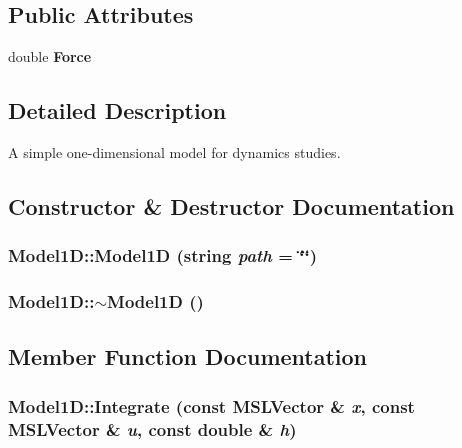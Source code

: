 \subsection*{Public Attributes}
\begin{CompactItemize}
\item 
double {\bf Force}
\end{CompactItemize}


\subsection{Detailed Description}
A simple one-dimensional model for dynamics studies.



\subsection{Constructor \& Destructor Documentation}
\subsubsection{\setlength{\rightskip}{0pt plus 5cm}Model1D::Model1D (string {\em path} = \char`\"{}\char`\"{})}\label{classModel1D_a0}


\subsubsection{\setlength{\rightskip}{0pt plus 5cm}Model1D::$\sim$Model1D ()\hspace{0.3cm}{\tt  [inline, virtual]}}\label{classModel1D_a1}




\subsection{Member Function Documentation}
\subsubsection{ Model1D::Integrate (const {\bf MSLVector} \& {\em x}, const {\bf MSLVector} \& {\em u}, const double \& {\em h})\hspace{0.3cm}{\tt  [virtual]}}\label{classModel1D_a3}


